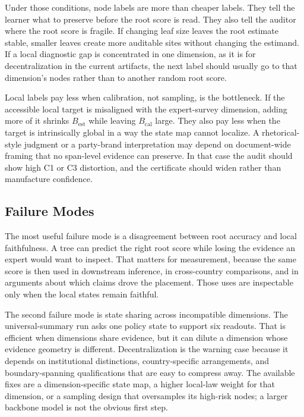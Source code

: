 Under those conditions, node labels are more than cheaper labels. They tell the
learner what to preserve before the root score is read. They also tell the
auditor where the root score is fragile. If changing leaf size leaves the root
estimate stable, smaller leaves create more auditable sites without changing
the estimand. If a local diagnostic gap is concentrated in one dimension, as it
is for decentralization in the current artifacts, the next label should usually
go to that dimension's nodes rather than to another random root score.

Local labels pay less when calibration, not sampling, is the
bottleneck. If the accessible local target is misaligned with the
expert-survey dimension, adding more of it shrinks
\(B_{\mathrm{est}}\) while leaving \(B_{\mathrm{cal}}\) large. They
also pay less when the target is intrinsically global in a way the
state map cannot localize. A rhetorical-style judgment or a
party-brand interpretation may depend on document-wide framing that no
span-level evidence can preserve. In that case the audit should show
high C1 or C3 distortion, and the certificate should widen rather than
manufacture confidence.

\subsection{Failure Modes}

The most useful failure mode is a disagreement between root accuracy
and local faithfulness. A tree can predict the right root score
while losing the evidence an expert would want to inspect. That
matters for measurement, because the same score is then used in
downstream inference, in cross-country comparisons, and in arguments
about which claims drove the placement. Those uses are inspectable
only when the local states remain faithful.

The second failure mode is state sharing across incompatible dimensions. The
universal-summary run asks one policy state to support six readouts. That is
efficient when dimensions share evidence, but it can dilute a dimension whose
evidence geometry is different. Decentralization is the warning case because it depends on
institutional distinctions, country-specific arrangements, and
boundary-spanning qualifications that are easy to compress away.
The available fixes are a dimension-specific state map, a higher
local-law weight for that dimension, or a sampling design that
oversamples its high-risk nodes; a larger backbone model is not
the obvious first step.

